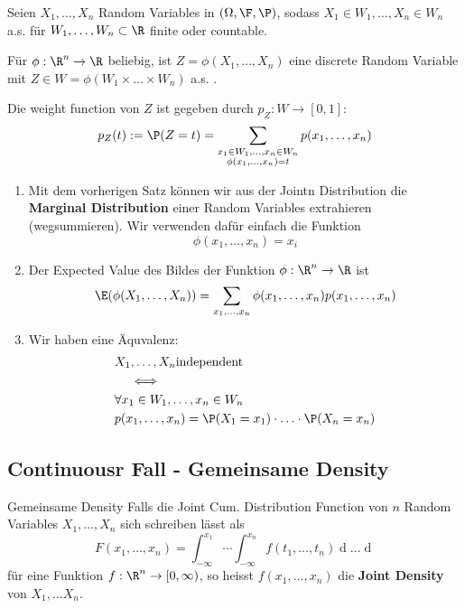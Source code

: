 \begin{subbox}{}
    Seien $X_1, \ldots, X_n$  Random Variables in $(\Omega, \F, \P)$, sodass $X_1 \in W_1, \ldots, X_n \in W_n$ a.s. für $W_1, \ldots, W_n \subset \R$ finite oder countable.

    Für $\phi: \R^n \to \R$ beliebig, ist $Z = \phi(X_1, \ldots, X_n)$ eine discrete Random Variable mit $Z \in W = \phi(W_1 \times \ldots \times W_n)$ a.s. . 

    Die weight function von $Z$ ist gegeben durch $p_Z: W \to [0,1]$:
    $$p_Z(t) := \P(Z = t) = \sum_{\substack{x_1 \in W_1, \ldots, x_n \in W_n\\ \phi(x_1, \ldots, x_n) = t}} p(x_1, \ldots, x_n)$$
\end{subbox}
\begin{enumerate}
    \item Mit dem vorherigen Satz können wir aus der Jointn Distribution die \textbf{Marginal Distribution} einer Random Variables extrahieren (wegsummieren). Wir verwenden dafür einfach die Funktion 
    $$\phi(x_1, \ldots, x_n) = x_i$$
    \item Der Expected Value des Bildes der Funktion $\phi: \R^n \to \R$ ist
    $$\E(\phi(X_1, \ldots, X_n)) = \sum_{x_1, \ldots, x_n}\phi(x_1, \ldots, x_n)p(x_1, \ldots, x_n)$$
    \item Wir haben eine Äquvalenz: 
    \begin{align*}
        &X_1, \ldots, X_n \text{independent}\\
        &\quad \iff \\
        &\forall x_1 \in W_1, \ldots, x_n \in W_n\\
        &p(x_1, \ldots, x_n) = \P(X_1 = x_1) \cdot \ldots \cdot \P(X_n = x_n)
    \end{align*}
\end{enumerate}

\subsection{Continuousr Fall - Gemeinsame Density}
\begin{mainbox}{Gemeinsame Density}
    Falls die Joint Cum. Distribution Function von $n$ Random Variables $X_1, \ldots, X_n$ sich schreiben lässt als
    $$F(x_1, \ldots, x_n) = \int_{-\infty}^{x_1} \cdots \int_{-\infty}^{x_n}f(t_1, \ldots, t_n) \mathop{dt_n}\ldots\mathop{dt_1}$$
    für eine Funktion $f: \R^n \to [0, \infty)$, so heisst $f(x_1, \ldots, x_n)$ die \textbf{Joint Density} von $X_1, \ldots X_n$.
\end{mainbox}
   
